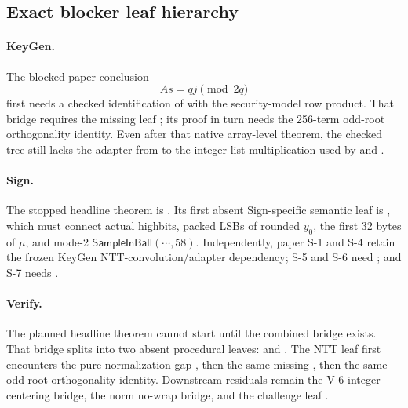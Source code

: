 \subsection*{Exact blocker leaf hierarchy}

\paragraph{KeyGen.}
The blocked paper conclusion
\[
  A s = q j \pmod{2q}
\]
first needs a checked identification of
 with the security-model row
product.  That bridge requires the missing leaf
; its proof in turn needs the
256-term odd-root orthogonality identity.  Even after that native array-level
theorem, the checked tree still lacks the adapter from 
to the integer-list multiplication used by
 and .

\paragraph{Sign.}
The stopped headline theorem is
.  Its first absent
Sign-specific semantic leaf is
, which must
connect actual highbits, packed LSBs of rounded \(y_0\), the first 32 bytes of
\(\mu\), and mode-2 \(\mathsf{SampleInBall}(\cdots,58)\).  Independently,
paper S-1 and S-4 retain the frozen KeyGen NTT-convolution/adapter dependency;
S-5 and S-6 need
; and S-7 needs
.

\paragraph{Verify.}
The planned headline theorem
 cannot
start until the combined bridge
 exists.  That bridge
splits into two absent procedural leaves:
 and
.  The NTT leaf first encounters
the pure normalization gap , then the
same missing , then the same
odd-root orthogonality identity.  Downstream residuals remain the V-6 integer
centering bridge, the norm no-wrap bridge, and the challenge leaf
.

